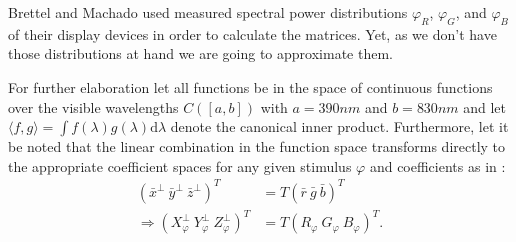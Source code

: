 \documentclass{sig-alternate-05-2015}
\newcommand{\dlambda}{\mathrm{d}\lambda}
\begin{document}
Brettel and Machado used measured spectral power distributions $\varphi_R$, $\varphi_G$, and $\varphi_B$ of their display devices in order to calculate the matrices.
Yet, as we don't have those distributions at hand we are going to approximate them.

For further elaboration let all functions be in the space of continuous functions over the visible wavelengths $C([a,b])$ with $a=390nm$ and $b=830nm$ and let $\langle f, g \rangle = \int f(\lambda) g(\lambda) \dlambda$ denote the canonical inner product.
Furthermore, let it be noted that the linear combination in the function space transforms directly to the appropriate coefficient spaces for any given stimulus $\varphi$ and coefficients as in :
\begin{eqnarray}
    \left( \bar x^\perp\ \bar y^\perp\ \bar z^\perp \right)^T
    & =
    T
    \left( \bar r\ \bar g\ \bar b \right)^T \\
    \label{eqn:coeff}
    \Rightarrow
    \left( X_\varphi^\perp\ Y_\varphi^\perp\ Z_\varphi^\perp \right)^T
    & =
    T
    \left( R_\varphi\ G_\varphi\ B_\varphi \right)^T.
\end{eqnarray}
\end{document}
